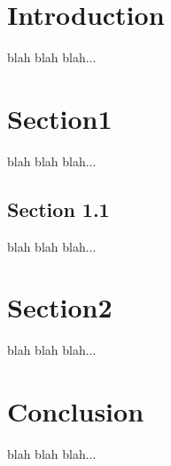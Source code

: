 \documentclass{myreport}
\begin{document}
\titlePage
\tableofcontents
\newpage
\section{Introduction}
blah blah blah...
\section{Section1}
blah blah blah...
\subsection{Section 1.1}
blah blah blah...
\newpage
\section{Section2}
blah blah blah...
\newpage
\section{Conclusion}
blah blah blah...
\end{document}
